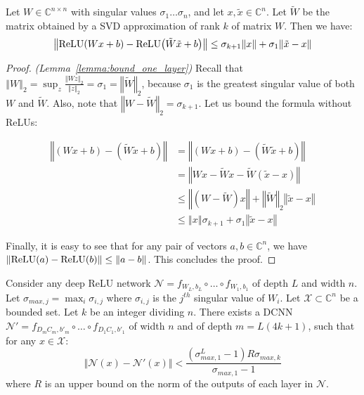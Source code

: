 \begin{lemma} \label{lemma:bound_one_layer}
Let $W\in\mathbb{C}^{n\times n}$ with singular values $\sigma_{1}\ldots\sigma_{n}$, and let $x,\tilde{x}\in\mathbb{C}^{n}$.
Let $\tilde{W}$ be the matrix obtained by a SVD approximation of rank $k$ of matrix $W$.
Then we have:
\begin{equation}
  \left\Vert \relu \left( Wx + b \right) - \relu \left( \tilde{W}\tilde{x}+b\right)\right\Vert \le\sigma_{k+1}\left\Vert x\right\Vert +\sigma_{1}\left\Vert \tilde{x}-x\right\Vert 
\end{equation}
\end{lemma}

\begin{proof} {\em (Lemma~\ref{lemma:bound_one_layer})}
Recall that $\left\Vert W\right\Vert _{2}=\sup_{z}\frac{\left\Vert Wz\right\Vert_2 }{\left\Vert z\right\Vert_2 }=\sigma_{1}=\left\Vert \tilde{W}\right\Vert _{2}$, because $\sigma_{1}$ is the greatest singular value of both $W$ and $\tilde{W}$. Also, note that $\left\Vert W-\tilde{W}\right\Vert _{2}=\sigma_{k+1}$. Let us bound the formula without ReLUs:

\begin{align*}
  \left\Vert \left(Wx+b\right)-\left(\tilde{W}\tilde{x}+b\right)\right\Vert  & =\left\Vert \left(Wx+b\right)-\left(\tilde{W}\tilde{x}+b\right)\right\Vert \\
   & =\left\Vert Wx-\tilde{W}x-\tilde{W}\left(\tilde{x}-x\right)\right\Vert \\
   & \le \left\Vert \left(W-\tilde{W}\right)x\right\Vert +\left\Vert \tilde{W}\right\Vert _{2}\left\Vert \tilde{x}-x\right\Vert \\
   & \le \left\Vert x\right\Vert \sigma_{k+1}+\sigma_{1}\left\Vert \tilde{x}-x\right\Vert 
\end{align*}

Finally, it is easy to see that for any pair of vectors $a,b\in\mathbb{C}^{n}$, we have $\left\Vert \relu(a) - \relu(b)\right\Vert \le\left\Vert a-b\right\Vert $.
This concludes the proof.
\end{proof}

\begin{corollary} \label{corollary:relu_to_circ}
  Consider any deep ReLU network $\mathcal{N} = f_{W_{L},b_{L}} \circ \ldots \circ f_{W_{1},b_{1}}$ of depth $L$ and width $n$.
  Let $\sigma_{max,j} = \max_{i} \sigma_{i,j}$ where $\sigma_{i,j}$ is the $j^{th}$ singular value of $W_{i}$.
  Let $\mathcal{X} \subset \mathbb{C}^{n}$ be a bounded set.
  Let $k$ be an integer dividing $n$.
  There exists a DCNN $\mathcal{N}' = f_{D_{m}C_{m},b'_{m}} \circ \ldots \circ f_{D_{1}C_{1},b'_{1}}$ of width $n$ and of depth $m=L(4k+1)$, such that for any $x\in\mathcal{X}$:
\begin{equation}
  \left\Vert \mathcal{N}\left(x\right)-\mathcal{N}'\left(x\right)\right\Vert <\frac{\left(\sigma_{max,1}^{L}-1\right)R\sigma_{max,k}}{\sigma_{max,1}-1}
\end{equation}
where $R$ is an upper bound on the norm of the outputs of each layer in $\mathcal{N}$.
\end{corollary}

